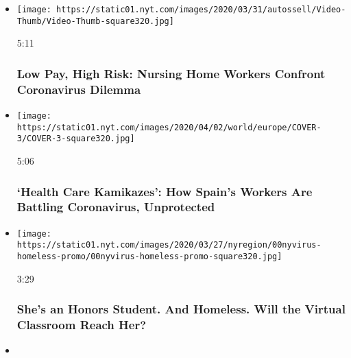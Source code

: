 \begin{itemize}
\item
  \href{https://www.nytimes.com/video/us/100000007046988/nursing-home-coronavirus.html?action=click\&module=video-series-bar\&region=header\&pgtype=Article\&playlistId=video/coronavirus-news-update}{}

  \texttt{[image: https://static01.nyt.com/images/2020/03/31/autossell/Video-Thumb/Video-Thumb-square320.jpg]}

  5:11

  \hypertarget{low-pay-high-risk-nursing-home-workers-confront-coronavirus-dilemma}{%
  \subsubsection{Low Pay, High Risk: Nursing Home Workers Confront
  Coronavirus
  Dilemma}\label{low-pay-high-risk-nursing-home-workers-confront-coronavirus-dilemma}}
\item
  \href{https://www.nytimes.com/video/world/europe/100000007051789/coronavirus-ppe-shortage-health-care-workers.html?action=click\&module=video-series-bar\&region=header\&pgtype=Article\&playlistId=video/coronavirus-news-update}{}

  \texttt{[image: https://static01.nyt.com/images/2020/04/02/world/europe/COVER-3/COVER-3-square320.jpg]}

  5:06

  \hypertarget{health-care-kamikazes-how-spains-workers-are-battling-coronavirus-unprotected}{%
  \subsubsection{`Health Care Kamikazes': How Spain's Workers Are
  Battling Coronavirus,
  Unprotected}\label{health-care-kamikazes-how-spains-workers-are-battling-coronavirus-unprotected}}
\item
  \href{https://www.nytimes.com/video/nyregion/nyregionspecial/100000007054051/shes-an-honors-student-and-homeless-will-the-virtual-classroom-reach-her.html?action=click\&module=video-series-bar\&region=header\&pgtype=Article\&playlistId=video/coronavirus-news-update}{}

  \texttt{[image: https://static01.nyt.com/images/2020/03/27/nyregion/00nyvirus-homeless-promo/00nyvirus-homeless-promo-square320.jpg]}

  3:29

  \hypertarget{shes-an-honors-student-and-homeless-will-the-virtual-classroom-reach-her}{%
  \subsubsection{She's an Honors Student. And Homeless. Will the Virtual
  Classroom Reach
  Her?}\label{shes-an-honors-student-and-homeless-will-the-virtual-classroom-reach-her}}
\item
  \href{https://www.nytimes.com/video/nyregion/100000007052136/coronavirus-elmhurst-hospital-queens.html?action=click\&module=video-series-bar\&region=header\&pgtype=Article\&playlistId=video/coronavirus-news-update}{}


\end{itemize}
